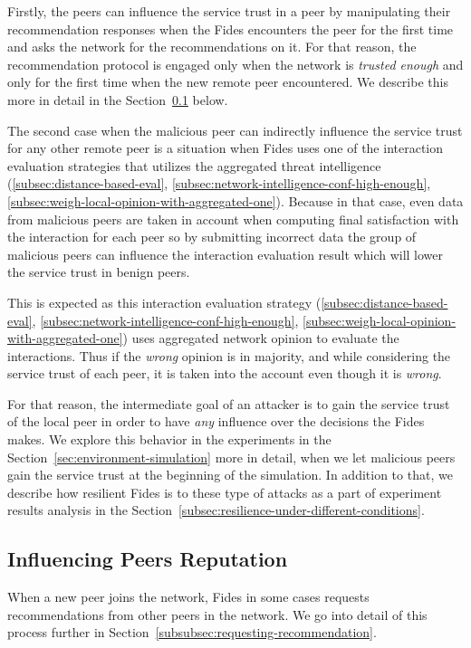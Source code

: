 Firstly, the peers can influence the service trust in a peer by manipulating their recommendation responses when the Fides encounters the peer for the first time and asks the network for the recommendations on it.
For that reason, the recommendation protocol is engaged only when the network is \textit{trusted enough} and only for the first time when the new remote peer encountered. We describe this more in detail in the Section~\ref{subsec:influencing-peers-reputation} below.

The second case when the malicious peer can indirectly influence the service trust for any other remote peer is a situation when Fides uses one of the interaction evaluation strategies that utilizes the aggregated threat intelligence (\ref{subsec:distance-based-eval}, \ref{subsec:network-intelligence-conf-high-enough}, \ref{subsec:weigh-local-opinion-with-aggregated-one}).
Because in that case, even data from malicious peers are taken in account when computing final satisfaction with the interaction for each peer so by submitting incorrect data the group of malicious peers can influence the interaction evaluation result which will lower the service trust in benign peers.

This is expected as this interaction evaluation strategy (\ref{subsec:distance-based-eval}, \ref{subsec:network-intelligence-conf-high-enough}, \ref{subsec:weigh-local-opinion-with-aggregated-one}) uses aggregated network opinion to evaluate the interactions.
Thus if the \textit{wrong} opinion is in majority, and while considering the service trust of each peer, it is taken into the account even though it is \textit{wrong}.

For that reason, the intermediate goal of an attacker is to gain the service trust of the local peer in order to have \textit{any} influence over the decisions the Fides makes.
We explore this behavior in the experiments in the Section~\ref{sec:environment-simulation} more in detail, when we let malicious peers gain the service trust at the beginning of the simulation. In addition to that, we describe how resilient Fides is to these type of attacks as a part of experiment results analysis in the Section~\ref{subsec:resilience-under-different-conditions}.

\subsection{Influencing Peers Reputation}
\label{subsec:influencing-peers-reputation}
When a new peer joins the network, Fides in some cases requests recommendations from other peers in the network.
We go into detail of this process further in Section~\ref{subsubsec:requesting-recommendation}.

